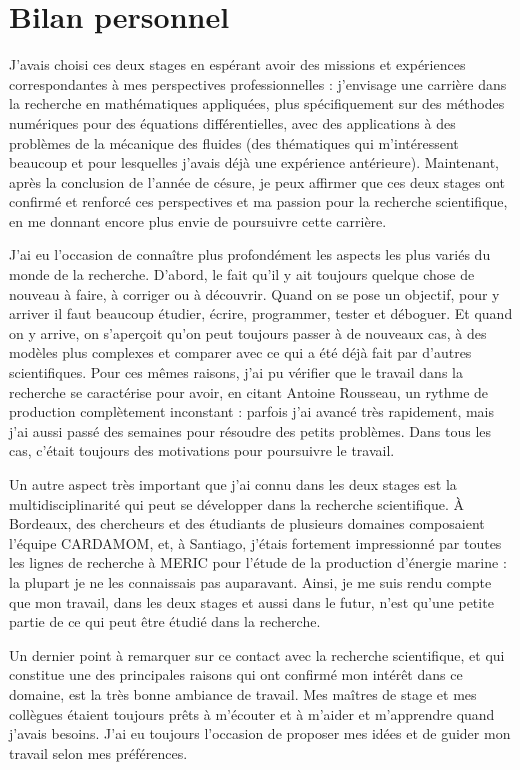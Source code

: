 \part*{Bilan personnel}

\indent J'avais choisi ces deux stages en espérant avoir des missions et expériences correspondantes à mes perspectives professionnelles : j'envisage une carrière dans la recherche en mathématiques appliquées, plus spécifiquement sur des méthodes numériques pour des équations différentielles, avec des applications à des problèmes de la mécanique des fluides (des thématiques qui m'intéressent beaucoup et pour lesquelles j'avais déjà une expérience antérieure). Maintenant, après la conclusion de l'année de césure, je peux affirmer que ces deux stages ont confirmé et renforcé ces perspectives et ma passion pour la recherche scientifique, en me donnant encore plus envie de poursuivre cette carrière.

\indent J'ai eu l'occasion de connaître plus profondément les aspects les plus variés du monde de la recherche. D'abord, le fait qu'il y ait toujours quelque chose de nouveau à faire, à corriger ou à découvrir. Quand on se pose un objectif, pour y arriver il faut beaucoup étudier, écrire, programmer, tester et déboguer. Et quand on y arrive, on s'aperçoit qu'on peut toujours passer à de nouveaux cas, à des modèles plus complexes et comparer avec ce qui a été déjà fait par d'autres scientifiques. Pour ces mêmes raisons, j'ai pu vérifier que le travail dans la recherche se caractérise pour avoir, en citant Antoine Rousseau, un rythme de production complètement inconstant : parfois j'ai avancé très rapidement, mais j'ai aussi passé des semaines pour résoudre des petits problèmes. Dans tous les cas, c'était toujours des motivations pour poursuivre le travail.

\indent Un autre aspect très important que j'ai connu dans les deux stages est la multidisciplinarité qui peut se développer dans la recherche scientifique. À Bordeaux, des chercheurs et des étudiants de plusieurs domaines composaient l'équipe CARDAMOM, et, à Santiago, j'étais fortement impressionné par toutes les lignes de recherche à MERIC pour l'étude de la production d'énergie marine : la plupart je ne les connaissais pas auparavant. Ainsi, je me suis rendu compte que mon travail, dans les deux stages et aussi dans le futur, n'est qu'une petite partie de ce qui peut être étudié dans la recherche.

\indent Un dernier point à remarquer sur ce contact avec la recherche scientifique, et qui constitue une des principales raisons qui ont confirmé mon intérêt dans ce domaine, est la très bonne ambiance de travail. Mes maîtres de stage et mes collègues étaient toujours prêts à m'écouter et à m'aider et m'apprendre quand j'avais besoins. J'ai eu toujours l'occasion de proposer mes idées et de guider mon travail selon mes préférences.

